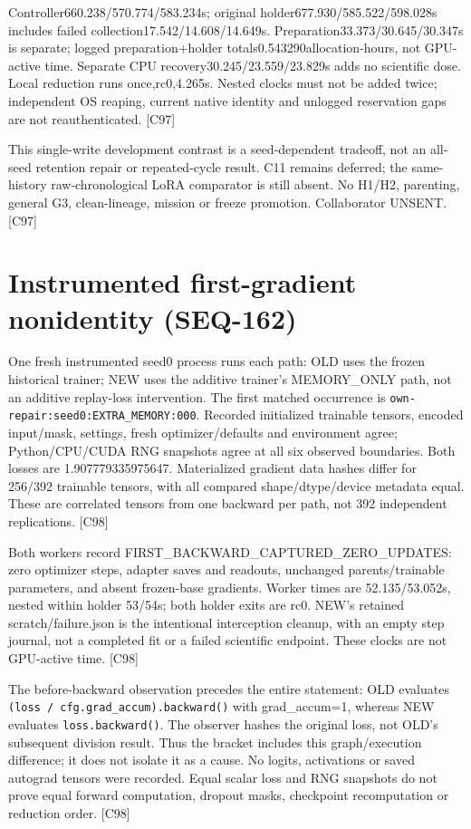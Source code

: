 \documentclass{article}
\begin{document}
Controller660.238/570.774/583.234s; original holder677.930/585.522/598.028s includes
failed collection17.542/14.608/14.649s. Preparation33.373/30.645/30.347s is separate;
logged preparation+holder totals0.543290allocation-hours, not GPU-active time.
Separate CPU recovery30.245/23.559/23.829s adds no scientific dose. Local reduction
runs once,rc0,4.265s. Nested clocks must not be added twice; independent OS reaping,
current native identity and unlogged reservation gaps are not reauthenticated. [C97]

This single-write development contrast is a seed-dependent tradeoff, not an
all-seed retention repair or repeated-cycle result. C11 remains deferred; the
same-history raw-chronological LoRA comparator is still absent. No H1/H2,
parenting, general G3, clean-lineage, mission or freeze promotion. Collaborator UNSENT. [C97]

\section{Instrumented first-gradient nonidentity (SEQ-162)}
\label{sec:seq162-gradient}
One fresh instrumented seed0 process runs each path: OLD uses the frozen
historical trainer; NEW uses the additive trainer's MEMORY\_ONLY path, not an
additive replay-loss intervention. The first matched occurrence is
\texttt{own-repair:seed0:EXTRA\_MEMORY:000}. Recorded initialized trainable tensors,
encoded input/mask, settings, fresh optimizer/defaults and environment agree;
Python/CPU/CUDA RNG snapshots agree at all six observed boundaries. Both losses
are 1.907779335975647. Materialized gradient data hashes differ for 256/392 trainable
tensors, with all compared shape/dtype/device metadata equal. These are correlated
tensors from one backward per path, not 392 independent replications. [C98]

Both workers record FIRST\_BACKWARD\_CAPTURED\_ZERO\_UPDATES: zero optimizer steps,
adapter saves and readouts, unchanged parents/trainable parameters, and absent
frozen-base gradients. Worker times are 52.135/53.052s, nested within holder
53/54s; both holder exits are rc0. NEW's retained scratch/failure.json is the
intentional interception cleanup, with an empty step journal, not a completed
fit or a failed scientific endpoint. These clocks are not GPU-active time. [C98]

The before-backward observation precedes the entire statement: OLD evaluates
\texttt{(loss / cfg.grad\_accum).backward()} with grad\_accum=1, whereas NEW evaluates
\texttt{loss.backward()}. The observer hashes the original loss, not OLD's subsequent
division result. Thus the bracket includes this graph/execution difference;
it does not isolate it as a cause. No logits, activations or saved autograd
tensors were recorded. Equal scalar loss and RNG snapshots do not prove equal
forward computation, dropout masks, checkpoint recomputation or reduction order. [C98]
\end{document}
